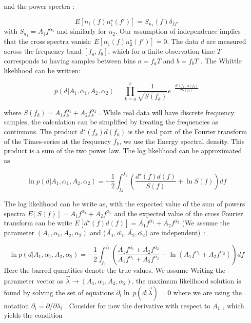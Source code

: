 \documentclass[a4paper,12pt]{article}
\begin{document}
and the power spectra :

\begin{equation}
    E[n_1(f)n_1^{\star}(f')] = S_{n_1}(f)\delta_{ff'}
\end{equation}
with $S_{n_1} = A_1f^{\alpha_1}$ and similarly for $n_2$. Our assumption of independence implies that the cross
spectra vanish: $E[n_1(f)n_2^{\star} (f')] = 0$. The data $d$ are measured across the frequency band $[f_a , f_b ]$,
which for a finite observation time $T$ corresponds to having samples between bins $a = f_a T$ and
$b = f_b T$ . The Whittle likelihood can be written:

\begin{equation} \label{likelihood}
    p(d|A_1 , \alpha_1 , A_2 , \alpha_2) = \prod_{k=a}^b \frac{1}{\sqrt{S(f_k)}} e^{-\frac{d^{\star}(f_k) d(f_k)}{2 S(f_k)}}
\end{equation}

where $S(f_k ) = A_1f_k^{\alpha_1} + A_2f_k^{\alpha_2}$ . While real data will have discrete frequency samples, the calculation can be simplified by treating the frequencies as continuous. The product $d^{\star}(f_k) d(f_k)$ is the real part of the Fourier transform of the Times-series at the frequency $f_k$, we use the Energy spectral density. This product is a sum of the two power law.  The  log likelihood can be approximated as

\begin{equation}
    \ln p(d|A_1 , \alpha_1 , A_2 , \alpha_2) = -\frac{1}{2} \int_{f_a}^{f_b} \left( \frac{d^{\star}(f) d(f)}{S(f)} + \ln S(f) \right) df 
\end{equation}

The log likelihood can be write as, with the expected value of the sum of powers spectra $E[S(f)] =
A_1f^{\alpha_1}+A_2f^{\alpha_2}$ and the expected value of the cross Fourier
transform can be write $E[d^{\star}(f)d(f)] = \overline{A_1}f^{\overline{\alpha_1}} +
\overline{A_2}f^{\overline{\alpha_2}}$ (We assume the parameter $(A_1 , \alpha_1 , A_2 , \alpha_2 )$
and ($\overline{A_1} , \overline{\alpha_1} , \overline{A_2} , \overline{\alpha_2})$ are independent)~:

\begin{equation}
    \ln p(d|A_1 , \alpha_1 , A_2 , \alpha_2) = -\frac{1}{2} \int_{f_a}^{f_b} \left( \frac{\overline{A_1}f^{\overline{\alpha_1}} + \overline{A_2}f^{\overline{\alpha_2}}}{A_1f^{\alpha_1} + A_2f^{\alpha_2}} + \ln (A_1f^{\alpha_1} + A_2f^{\alpha_2}) \right) df 
\end{equation}
Here the barred quantities denote the true values. We assume Writing the parameter vector as $\overrightarrow{\lambda} \to (A_1 , \alpha_1 , A_2 , \alpha_2 )$, the maximum likelihood solution is found by solving the set of equations $\partial_i \ln \ p(d|\overrightarrow{\lambda}) = 0$ where we are using the notation $\partial_i = \partial/\partial \lambda_i$ . Consider for now the derivative with respect to $A_1$ , which yields the condition
\end{document}
